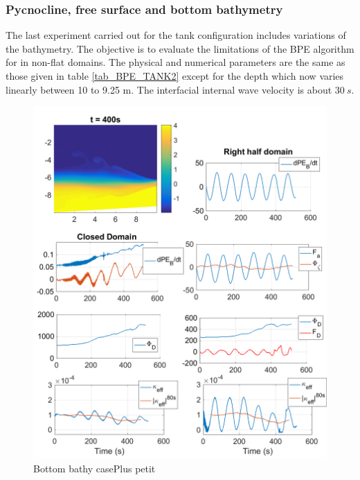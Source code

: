 \subsubsection{Pycnocline, free surface and bottom bathymetry}
The last experiment carried out for the tank configuration includes variations of the bathymetry. The objective is to evaluate the limitations of the BPE algorithm for in non-flat domains. The physical and numerical parameters are the same as those given in table \ref{tab_BPE_TANK2} except for the depth which now varies linearly between 10 to 9.25 m. The interfacial internal wave velocity is about $30\ s$.\\
\begin{figure}[h!]
\includegraphics[width=1.\textwidth]{./CHAP_BPE/Fig_TANK_pycbath.png}
\caption{Bottom bathy case\color{red}Plus petit\color{black}}
\label{figCbath}
\end{figure}
